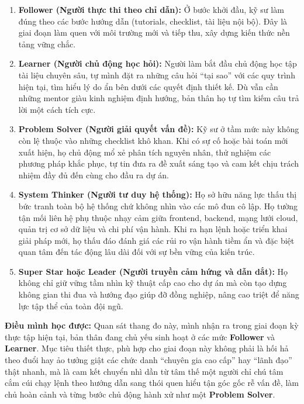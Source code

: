 \begin{enumerate}
\def\labelenumi{\arabic{enumi}.}
\tightlist
\item
  \textbf{Follower (Người thực thi theo chỉ dẫn):} Ở bước khởi đầu, kỹ
  sư làm đúng theo các bước hướng dẫn (tutorials, checklist, tài liệu
  nội bộ). Đây là giai đoạn làm quen với môi trường mới và tiếp thu, xây
  dựng kiến thức nền tảng vững chắc.
\item
  \textbf{Learner (Người chủ động học hỏi):} Người làm bắt đầu chủ động
  học tập tài liệu chuyên sâu, tự mình đặt ra những câu hỏi ``tại sao''
  với các quy trình hiện tại, tìm hiểu lý do ẩn bên dưới các quyết định
  thiết kế. Dù vẫn cần những mentor giàu kinh nghiệm định hướng, bản
  thân họ tự tìm kiếm câu trả lời một cách tích cực.
\item
  \textbf{Problem Solver (Người giải quyết vấn đề):} Kỹ sư ở tầm mức này
  không còn lệ thuộc vào những checklist khô khan. Khi có sự cố hoặc bài
  toán mới xuất hiện, họ chủ động mổ xẻ phân tích nguyên nhân, thử
  nghiệm các phương pháp khắc phục, tự tin đưa ra đề xuất sáng tạo và
  cam kết chịu trách nhiệm đầy đủ đến cùng cho đầu ra dự án.
\item
  \textbf{System Thinker (Người tư duy hệ thống):} Họ sở hữu năng lực
  thấu thị bức tranh toàn bộ hệ thống chứ không nhìn vào các mô đun cô
  lập. Họ tường tận mối liên hệ phụ thuộc nhạy cảm giữa frontend,
  backend, mạng lưới cloud, quản trị cơ sở dữ liệu và chi phí vận hành.
  Khi ra hạn lệnh hoặc triển khai giải pháp mới, họ thấu đáo đánh giá
  các rủi ro vận hành tiềm ẩn và đặc biệt quan tâm đến tác động lâu dài
  đối với sự bền vững của kiến trúc.
\item
  \textbf{Super Star hoặc Leader (Người truyền cảm hứng và dẫn dắt):} Họ
  không chỉ giữ vững tầm nhìn kỹ thuật cấp cao cho dự án mà còn tạo dựng
  không gian thi đua và hướng đạo giúp đỡ đồng nghiệp, nâng cao triệt để
  năng lực tập thể của toàn đội ngũ.
\end{enumerate}

\textbf{Điều mình học được:} Quan sát thang đo này, mình nhận ra trong
giai đoạn kỳ thực tập hiện tại, bản thân đang chủ yếu sinh hoạt ở các
mức \textbf{Follower} và \textbf{Learner}. Mục tiêu thiết thực, phù hợp
cho giai đoạn này không phải là hối hả theo đuổi hay ảo tưởng giật các
chức danh ``chuyên gia cao cấp'' hay ``lãnh đạo'' thật nhanh, mà là cam
kết chuyển nhì dần từ tâm thế một người chỉ chú tâm cắm cúi chạy lệnh
theo hướng dẫn sang thói quen hiểu tận góc gốc rễ vấn đề, làm chủ hoàn
cảnh và từng bước chủ động hành xử như một \textbf{Problem Solver}.

